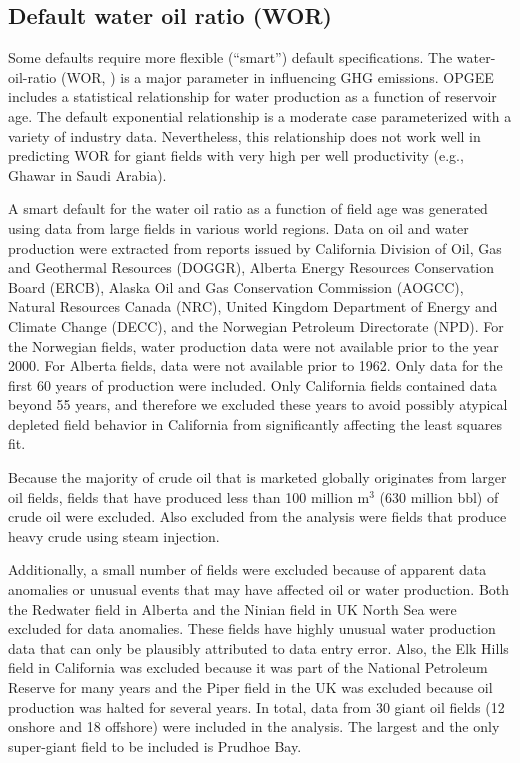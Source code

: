 \documentclass[11pt]{report}
\newcommand{\xlname}[1]{\raisebox{1pt}{\fcolorbox{light-gray}{light-gray}{\texttt{\textcolor{stanford}{\scriptsize{#1}}}}}}
\begin{document}
\subsection{Default water oil ratio (WOR)} \label{WORSmartDefault}

Some defaults require more flexible ($“$smart$”$) default specifications. The water-oil-ratio (WOR, \xlname{WOR}) is a major parameter in influencing GHG emissions. OPGEE includes a statistical relationship for water production as a function of reservoir age. The default exponential relationship is a moderate case parameterized with a variety of industry data. Nevertheless, this relationship does not work well in predicting WOR for giant fields with very high per well productivity (e.g., Ghawar in Saudi Arabia).

A smart default for the water oil ratio as a function of field age was generated using data from large fields in various world regions. Data on oil and water production were extracted from reports issued by California Division of Oil, Gas and Geothermal Resources (DOGGR), Alberta Energy Resources Conservation Board (ERCB), Alaska Oil and Gas Conservation Commission (AOGCC), Natural Resources Canada (NRC), United Kingdom Department of Energy and Climate Change (DECC), and the Norwegian Petroleum Directorate (NPD). For the Norwegian fields, water production data were not available prior to the year 2000. For Alberta fields, data were not available prior to 1962. Only data for the first 60 years of production were included. Only California fields contained data beyond 55 years, and therefore we excluded these years to avoid possibly atypical depleted field behavior in California from significantly affecting the least squares fit. 

Because the majority of crude oil that is marketed globally originates from larger oil fields, fields that have produced less than 100 million m$^3$ (630 million bbl) of crude oil were excluded. Also excluded from the analysis were fields that produce heavy crude using steam injection. 

Additionally, a small number of fields were excluded because of apparent data anomalies or unusual events that may have affected oil or water production. Both the Redwater field in Alberta and the Ninian field in UK North Sea were excluded for data anomalies. These fields have highly unusual water production data that can only be plausibly attributed to data entry error. Also, the Elk Hills field in California was excluded because it was part of the National Petroleum Reserve for many years and the Piper field in the UK was excluded because oil production was halted for several years. In total, data from 30 giant oil fields (12 onshore and 18 offshore) were included in the analysis. The largest and the only super-giant field to be included is Prudhoe Bay.
\end{document}
